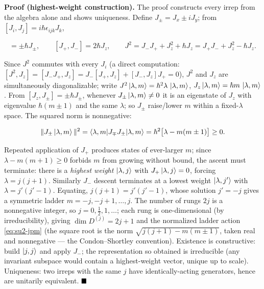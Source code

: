 \medskip\noindent\textbf{Proof (highest-weight construction).} The proof constructs every irrep from the algebra alone and shows uniqueness. Define $J_{\pm}=J_{x}\pm iJ_{y}$; from $[J_{i},J_{j}]=i\hbar\epsilon_{ijk}J_{k}$,
\begin{linenomath}
\begin{equation*}
[J_{z},J_{\pm}]=\pm\hbar J_{\pm},\qquad [J_{+},J_{-}]=2\hbar J_{z},\qquad J^{2}=J_{-}J_{+}+J_{z}^{2}+\hbar J_{z}=J_{+}J_{-}+J_{z}^{2}-\hbar J_{z}.
\end{equation*}
\end{linenomath}
Since $J^{2}$ commutes with every $J_{i}$ (a direct computation: $[J^{2},J_{z}]=[J_{-}J_{+},J_{z}]=J_{-}[J_{+},J_{z}]+[J_{-},J_{z}]J_{+}=0$), $J^{2}$ and $J_{z}$ are simultaneously diagonalizable; write $J^{2}\ket{\lambda,m}=\hbar^{2}\lambda\,\ket{\lambda,m}$, $J_{z}\ket{\lambda,m}=\hbar m\,\ket{\lambda,m}$. From $[J_{z},J_{\pm}]=\pm\hbar J_{\pm}$, whenever $J_{\pm}\ket{\lambda,m}\neq0$ it is an eigenstate of $J_{z}$ with eigenvalue $\hbar(m\pm1)$ and the same $\lambda$; so $J_{\pm}$ raise/lower $m$ within a fixed-$\lambda$ space. The squared norm is nonnegative:
\begin{linenomath}
\begin{equation*}
\|J_{\pm}\ket{\lambda,m}\|^{2}=\braket{\lambda,m|J_{\mp}J_{\pm}|\lambda,m}=\hbar^{2}\bigl[\lambda-m(m\pm1)\bigr]\ge0.
\end{equation*}
\end{linenomath}
Repeated application of $J_{+}$ produces states of ever-larger $m$; since $\lambda-m(m+1)\ge0$ forbids $m$ from growing without bound, the ascent must terminate: there is a \emph{highest weight} $\ket{\lambda,j}$ with $J_{+}\ket{\lambda,j}=0$, forcing $\lambda=j(j+1)$. Similarly $J_{-}$ descent terminates at a lowest weight $\ket{\lambda,j'}$ with $\lambda=j'(j'-1)$. Equating, $j(j+1)=j'(j'-1)$, whose solution $j'=-j$ gives a symmetric ladder $m=-j,-j+1,\ldots,j$. The number of rungs $2j$ is a nonnegative integer, so $j=0,\tfrac12,1,\ldots$; each rung is one-dimensional (by irreducibility), giving $\dim D^{(j)}=2j+1$ and the normalized ladder action \eqref{eq:su2-jpm} (the square root is the norm $\sqrt{j(j+1)-m(m\pm1)}$, taken real and nonnegative --- the Condon--Shortley convention). Existence is constructive: build $\ket{j,j}$ and apply $J_{-}$; the representation so obtained is irreducible (any invariant subspace would contain a highest-weight vector, unique up to scale). Uniqueness: two irreps with the same $j$ have identically-acting generators, hence are unitarily equivalent. $\hfill\blacksquare$

